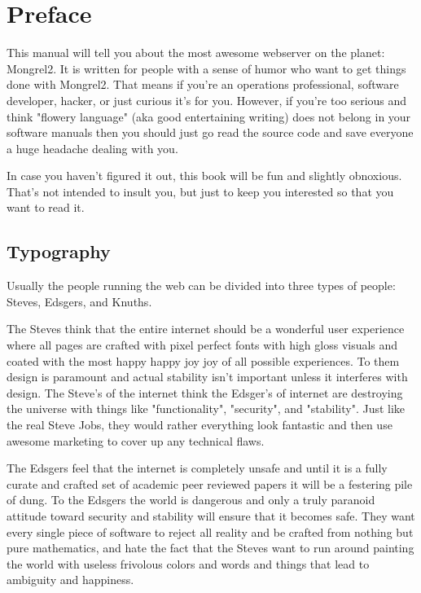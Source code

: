 \chapter*{Preface}

This manual will tell you about the most awesome webserver on the planet: Mongrel2.
It is written for people with a sense of humor who want to get things done with Mongrel2.
That means if you're an operations professional, software developer, hacker, or just
curious it's for you.  However, if you're too serious and think "flowery language"
(aka good entertaining writing) does not belong in your software manuals then you should just
go read the source code and save everyone a huge headache dealing with you.

In case you haven't figured it out, this book will be fun and slightly obnoxious.  That's
not intended to insult you, but just to keep you interested so that you want to read it.


\section*{Typography}

Usually the people running the web can be divided into three types of people:  Steves,
Edsgers, and Knuths.

The Steves think that the entire internet should be a wonderful user
experience where all pages are crafted with pixel perfect fonts with high gloss
visuals and coated with the most happy happy joy joy of all possible
experiences.  To them design is paramount and actual stability isn't important
unless it interferes with design.  The Steve's of the internet think the
Edsger's of internet are destroying the universe with things like
"functionality", "security", and "stability".  Just like the real Steve Jobs, they
would rather everything look fantastic and then use awesome marketing to cover
up any technical flaws.

The Edsgers feel that the internet is completely unsafe and until it is a fully
curate and crafted set of academic peer reviewed papers it will be a festering
pile of dung.  To the Edsgers the world is dangerous and only a truly paranoid
attitude toward security and stability will ensure that it becomes safe.  They
want every single piece of software to reject all reality and be crafted from
nothing but pure mathematics, and hate the fact that the Steves want to run
around painting the world with useless frivolous colors and words and things
that lead to ambiguity and happiness.

